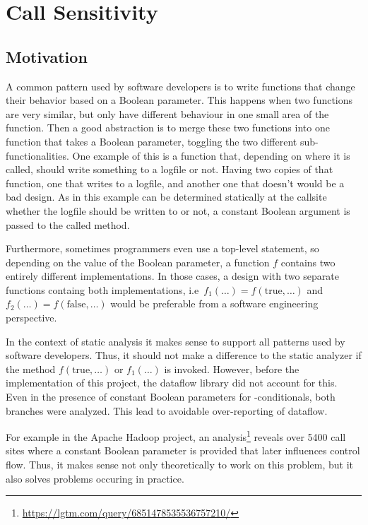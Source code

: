 \section{Call Sensitivity}
\label{sec:call-sens}
\subsection{Motivation}
A common pattern used by software developers is to 
write functions that change their behavior based on 
a Boolean parameter.
This happens when two functions are very similar, but only have different behaviour
in one small area of the function.
Then a good abstraction is to merge these two functions into one function that takes 
a Boolean parameter, toggling the two different sub-functionalities.
One example of this is a function that, depending on where it is called,
should write something to a logfile or not.
Having two copies of that function, one that writes to a logfile, and another one 
that doesn't would be a bad design.
As in this example can be determined statically at the callsite whether the logfile
should be written to or not, a constant Boolean argument is passed to the called method.

Furthermore, sometimes programmers even use a top-level
 statement, so depending on the
value of the Boolean parameter, a function $f$ contains two entirely different implementations.
In those cases, a design with two separate functions containg both implementations,
i.e\ $f_1(\ldots) = f(\text{true}, \ldots)$ and $f_2(\ldots) = f(\text{false}, \ldots)$
would be preferable from a software engineering perspective.

In the context of static analysis it makes sense to support all patterns
used by software developers.
Thus, it should not make a difference to the static analyzer
if the method $f(\text{true}, \ldots)$ or $f_1(\ldots)$ is invoked.
However, before the implementation of this project, the dataflow library did not 
account for this.
Even in the presence of constant Boolean parameters for -conditionals,
both branches were analyzed.
This lead to avoidable over-reporting of dataflow.

For example in the Apache Hadoop project, an analysis\footnote{\url{https://lgtm.com/query/6851478535536757210/}}
reveals over 5400 call sites 
where a constant Boolean parameter is provided that later influences control flow.
Thus, it makes sense not only theoretically to work on this problem, but it also 
solves problems occuring in practice.

